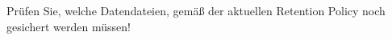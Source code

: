     \item Prüfen Sie, welche Datendateien, gemäß der aktuellen Retention Policy noch gesichert werden müssen!
